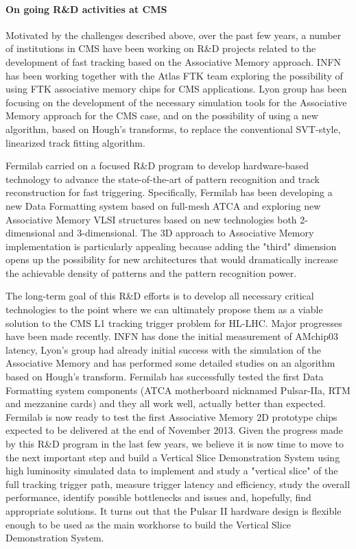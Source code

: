 \paragraph{\bf On going R\&D activities at CMS\\}

\noindent Motivated by the challenges described above, over the past few years, a number of institutions in CMS have been working on R\&D projects related to the development of fast tracking based on the Associative Memory approach. INFN has been working together with the Atlas FTK team exploring the possibility of using FTK associative memory chips for CMS applications. Lyon group has been focusing on the development of the necessary simulation tools for the Associative Memory approach for the CMS case, and on the possibility of using a new algorithm, based on Hough's transforms, to replace the conventional SVT-style, linearized track fitting algorithm. 

\noindent Fermilab carried on a focused R\&D program to develop hardware-based technology to advance the state-of-the-art of pattern recognition and track reconstruction for fast triggering. Specifically, Fermilab has been developing a new Data Formatting system based on full-mesh ATCA and exploring new Associative Memory VLSI structures based on new technologies both 2-dimensional and 3-dimensional. The 3D approach to Associative Memory implementation is particularly appealing because adding the "third" dimension opens up the possibility for new architectures that would dramatically increase the achievable density of patterns and the pattern recognition power. 

\noindent The long-term goal of this R\&D efforts is to develop all necessary critical technologies to the point where we can ultimately propose them as a viable solution to the CMS L1 tracking trigger problem for HL-LHC. Major progresses have been made recently. INFN has done the initial measurement of AMchip03 latency, Lyon's group had already initial success with the simulation of the Associative Memory and has performed some detailed studies on an algorithm based on Hough's transform. Fermilab has successfully tested the first Data Formatting system components (ATCA motherboard nicknamed Pulsar-IIa, RTM and mezzanine cards) and they all work well, actually better than expected. Fermilab is now ready to test the first Associative Memory 2D prototype chips expected to be delivered at the end of November 2013. Given the progress made by this R\&D program in the last few years, we believe it is now time to move to the next important step and build a Vertical Slice Demonstration System using high luminosity simulated data to implement and study a "vertical slice" of the full tracking trigger path, measure trigger latency and efficiency, study the overall performance, identify possible bottlenecks and issues and, hopefully, find appropriate solutions.  It turns out that the Pulsar II hardware design is flexible enough to be used as the main workhorse to build the Vertical Slice Demonstration System.

